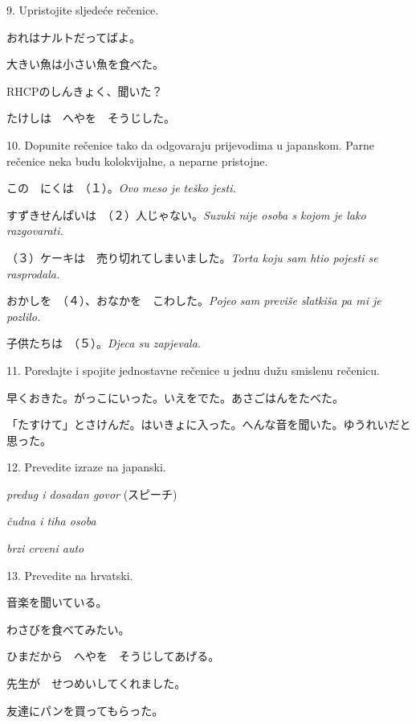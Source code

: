 	\begin{mondai}{9. Upristojite sljedeće rečenice.}
		\item おれはナルトだってばよ。
		\item 大きい魚は小さい魚を食べた。
		\item RHCPのしんきょく、聞いた？
		\item たけしは　へやを　そうじした。
	\end{mondai}
	
	\begin{mondai}{10. Dopunite rečenice tako da odgovaraju prijevodima u japanskom. Parne rečenice neka budu kolokvijalne, a neparne pristojne.}
		\item この　にくは　（１）。\textit{Ovo meso je teško jesti.}
		\item すずきせんぱいは　（２）人じゃない。\textit{Suzuki nije osoba s kojom je lako razgovarati.}
		\item （３）ケーキは　売り切れてしまいました。\textit{Torta koju sam htio pojesti se rasprodala.}
		\item おかしを　（４）、おなかを　こわした。\textit{Pojeo sam previše slatkiša pa mi je pozlilo.}
		\item 子供たちは　（５）。\textit{Djeca su zapjevala.}
	\end{mondai}

	\begin{mondai}{11. Poredajte i spojite jednostavne rečenice u jednu dužu smislenu rečenicu.}
		\item 早くおきた。がっこにいった。いえをでた。あさごはんをたべた。
		\item 「たすけて」とさけんだ。はいきょに入った。へんな音を聞いた。ゆうれいだと思った。
	\end{mondai}

	\begin{mondai}{12. Prevedite izraze na japanski.}
		\item \textit{predug i dosadan govor} (スピーチ)
		\item \textit{čudna i tiha osoba}
		\item \textit{brzi crveni auto}
	\end{mondai}

	\newpage
	\begin{mondai}{13. Prevedite na hrvatski.}
		\item 音楽を聞いている。
		\item わさびを食べてみたい。
		\item ひまだから　へやを　そうじしてあげる。
		\item 先生が　せつめいしてくれました。
		\item 友達にパンを買ってもらった。
	\end{mondai}

